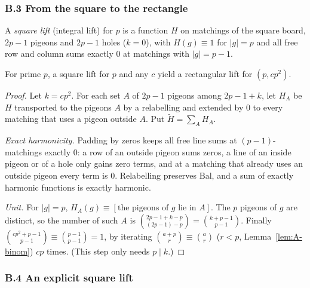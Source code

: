 \subsubsection*{B.3 From the square to the rectangle}

\begin{definition}\label{def:square-lift}
A \emph{square lift} (integral lift) for $p$ is a function $H$ on matchings of the
square board, $2p-1$ pigeons and $2p-1$ holes ($k=0$), with $H(g)\equiv1$ for
$|g|=p$ and all free row and column sums exactly $0$ at matchings with
$|g|=p-1$.
\end{definition}

\begin{proposition}\label{prop:transfer}
For prime $p$, a square lift for $p$ and any $c$ yield a rectangular lift for
$(p,cp^2)$.
\end{proposition}

\begin{proof}
Let $k=cp^2$.  For each set $A$ of $2p-1$ pigeons among $2p-1+k$, let $H_A$ be $H$
transported to the pigeons $A$ by a relabelling and extended by $0$ to every
matching that uses a pigeon outside $A$.
Put $\widetilde H=\sum_AH_A$.

\emph{Exact harmonicity.}  Padding by zeros keeps all free line sums at
$(p-1)$-matchings exactly $0$: a row of an outside pigeon sums zeros, a line of an
inside pigeon or of a hole only gains zero terms, and at a matching that already
uses an outside pigeon every term is $0$.  Relabelling preserves $\mathrm{Bal}$, and
a sum of exactly harmonic functions is exactly harmonic.

\emph{Unit.}  For $|g|=p$, $H_A(g)\equiv[\text{the pigeons of $g$ lie in $A$}]$.
The $p$ pigeons of $g$ are distinct, so the number of such $A$ is
$\binom{2p-1+k-p}{(2p-1)-p}=\binom{k+p-1}{p-1}$.
Finally $\binom{cp^2+p-1}{p-1}\equiv\binom{p-1}{p-1}=1$, by iterating
$\binom{a+p}r\equiv\binom ar$ ($r<p$, Lemma~\ref{lem:A-binom}) $cp$
times.
(This step only needs $p\mid k$.)
\end{proof}

\subsubsection*{B.4 An explicit square lift}

